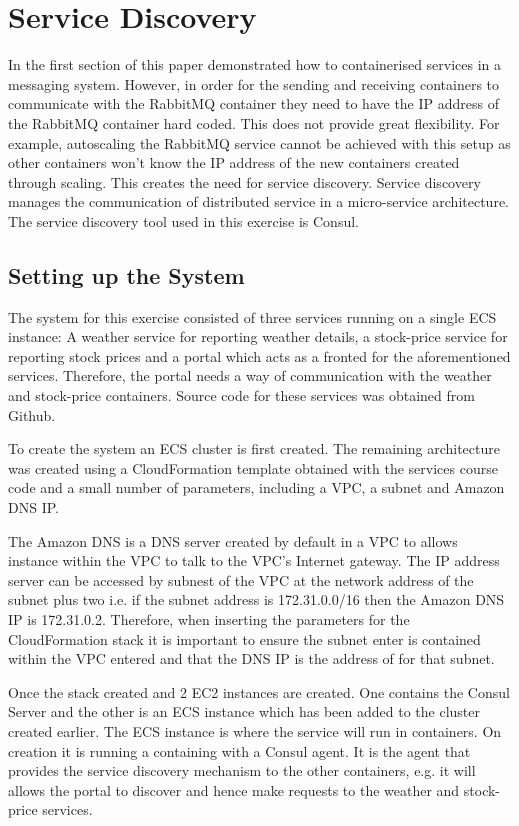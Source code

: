 \section{Service Discovery}
In the first section of this paper demonstrated how to containerised services in a messaging system. However, in order for the sending and receiving containers to communicate with the RabbitMQ container they need to have the IP address of the RabbitMQ container hard coded. This does not provide great flexibility. For example, autoscaling the RabbitMQ service cannot be achieved with this setup as other containers won't know the IP address of the new containers created through scaling. This creates the need for service discovery. Service discovery manages the communication of distributed service in a micro-service architecture. The service discovery tool used in this exercise is Consul.

\subsection{Setting up the System}
The system for this exercise consisted of three services running on a single ECS instance: A weather service for reporting weather details, a stock-price service for reporting stock prices and a portal which acts as a fronted for the aforementioned services. Therefore, the portal needs a way of communication with the weather and stock-price containers. Source code for these services was obtained from Github.

To create the system an ECS cluster is first created. The remaining architecture was created using a CloudFormation template obtained with the services course code and a small number of parameters, including a VPC, a subnet and Amazon DNS IP.

The Amazon DNS is a DNS server created by default in a VPC to allows instance within the VPC to talk to the VPC's Internet gateway. The IP address server can be accessed by subnest of the VPC at the network address of the subnet plus two i.e. if the subnet address is 172.31.0.0/16 then the Amazon DNS IP is 172.31.0.2. Therefore, when inserting the parameters for the CloudFormation stack it is important to ensure the subnet enter is contained within the VPC entered and that the DNS IP is the address of for that subnet.

Once the stack created and 2 EC2 instances are created. One contains the Consul Server and the other is an ECS instance which has been added to the cluster created earlier. The ECS instance is where the service will run in containers. On creation it is running a containing with a Consul agent. It is the agent that provides the service discovery mechanism to the other containers, e.g. it will allows the portal to discover and hence make requests to the weather and stock-price services.

